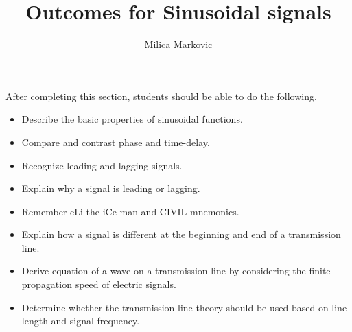 \documentclass{ximera}
\title{Outcomes for Sinusoidal signals}
\author{Milica Markovic}
\begin{document}
\begin{abstract}
\end{abstract}

\maketitle


\begin{sectionOutcomes}
After completing this section, students should be able to do the following.
\begin{itemize}
\item Describe the basic properties of sinusoidal functions.
\item Compare and contrast phase and time-delay.
\item Recognize leading and lagging signals. 
\item Explain why a signal is leading or lagging.
\item Remember eLi the iCe man and CIVIL mnemonics.
\item Explain how a signal is different at the beginning and end of a transmission line.
\item Derive equation of a wave on a transmission line by considering the finite propagation speed of electric signals.
\item Determine whether the transmission-line theory should be used based on line length and signal frequency.
\end{itemize}
\end{sectionOutcomes}
\end{document}
